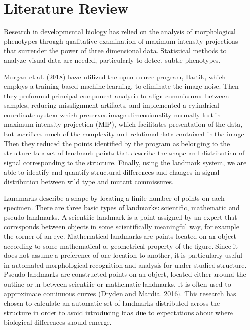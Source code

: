 \documentclass[10pt,letterpaper]{article}
\begin{document}
\section{Literature Review}\label{literature-review}

Research in developmental biology has relied on the analysis of
morphological phenotypes through qualitative examination of maximum
intensity projections that surrender the power of three dimensional
data. Statistical methods to analyze visual data are needed,
particularly to detect subtle phenotypes.

Morgan et al. (2018) have utilized the open source program, Ilastik,
which employs a training based machine learning, to eliminate the image
noise. Then they preformed principal component analysis to align
commissures between samples, reducing misalignment artifacts, and
implemented a cylindrical coordinate system which preserves image
dimensionality normally lost in maximum intensity projection (MIP),
which facilitates presentation of the data, but sacrifices much of the
complexity and relational data contained in the image. Then they reduced
the points identified by the program as belonging to the structure to a
set of landmark points that describe the shape and distribution of
signal corresponding to the structure. Finally, using the landmark
system, we are able to identify and quantify structural differences and
changes in signal distribution between wild type and mutant commissures.

Landmarks describe a shape by locating a finite number of points on each
specimen. There are three basic types of landmarks: scientific,
mathematic and pseudo-landmarks. A scientific landmark is a point
assigned by an expert that corresponds between objects in some
scientifically meaningful way, for example the corner of an eye.
Mathematical landmarks are points located on an object according to some
mathematical or geometrical property of the figure. Since it does not
assume a preference of one location to another, it is particularly
useful in automated morphological recognition and analysis for
under-studied structure. Pseudo-landmarks are constructed points on an
object, located either around the outline or in between scientific or
mathematic landmarks. It is often used to approximate continuous curves
(Dryden and Mardia, 2016). This research has chosen to calculate an
automatic set of landmarks distributed across the structure in order to
avoid introducing bias due to expectations about where biological
differences should emerge.
\end{document}
